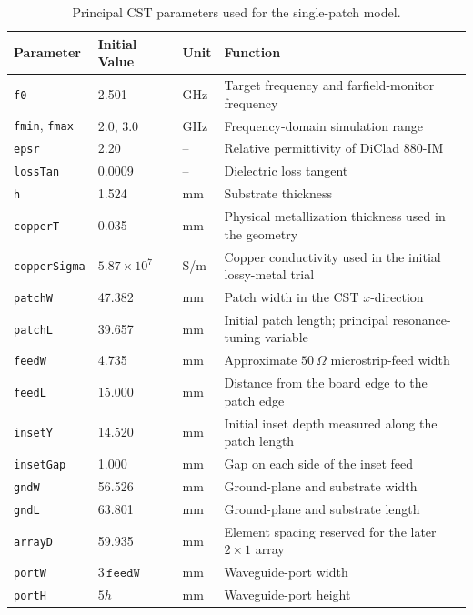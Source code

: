 \begin{table}[H]
\centering
\caption{Principal CST parameters used for the single-patch model.}
\label{tab:cst-single-patch-parameters}
\footnotesize
\setlength{\tabcolsep}{4pt}
\renewcommand{\arraystretch}{1.15}
\begin{tabularx}{\textwidth}{@{}lllX@{}}
\toprule
\textbf{Parameter} & \textbf{Initial Value} & \textbf{Unit} & \textbf{Function} \\
\midrule
\texttt{f0} & 2.501 & GHz & Target frequency and farfield-monitor frequency \\
\texttt{fmin}, \texttt{fmax} & 2.0, 3.0 & GHz & Frequency-domain simulation range \\
\texttt{epsr} & 2.20 & -- & Relative permittivity of DiClad 880-IM \\
\texttt{lossTan} & 0.0009 & -- & Dielectric loss tangent \\
\texttt{h} & 1.524 & mm & Substrate thickness \\
\texttt{copperT} & 0.035 & mm & Physical metallization thickness used in the geometry \\
\texttt{copperSigma} & $5.87\times10^7$ & S/m & Copper conductivity used in the initial lossy-metal trial \\
\texttt{patchW} & 47.382 & mm & Patch width in the CST $x$-direction \\
\texttt{patchL} & 39.657 & mm & Initial patch length; principal resonance-tuning variable \\
\texttt{feedW} & 4.735 & mm & Approximate $50~\Omega$ microstrip-feed width \\
\texttt{feedL} & 15.000 & mm & Distance from the board edge to the patch edge \\
\texttt{insetY} & 14.520 & mm & Initial inset depth measured along the patch length \\
\texttt{insetGap} & 1.000 & mm & Gap on each side of the inset feed \\
\texttt{gndW} & 56.526 & mm & Ground-plane and substrate width \\
\texttt{gndL} & 63.801 & mm & Ground-plane and substrate length \\
\texttt{arrayD} & 59.935 & mm & Element spacing reserved for the later $2\times1$ array \\
\texttt{portW} & $3\,\texttt{feedW}$ & mm & Waveguide-port width \\
\texttt{portH} & $5h$ & mm & Waveguide-port height \\
\bottomrule
\end{tabularx}
\end{table}

